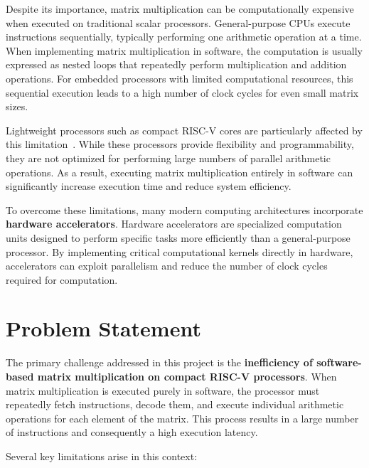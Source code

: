 ﻿\documentclass[12pt,a4paper]{report}
\begin{document}
Despite its importance, matrix multiplication can be computationally expensive when executed on traditional scalar processors. 
General-purpose CPUs execute instructions sequentially, typically performing one arithmetic operation at a time. 
When implementing matrix multiplication in software, the computation is usually expressed as nested loops that repeatedly perform multiplication and addition operations. 
For embedded processors with limited computational resources, this sequential execution leads to a high number of clock cycles for even small matrix sizes.

Lightweight processors such as compact RISC-V cores are particularly affected by this limitation~\cite{asanovic2014instruction}.
While these processors provide flexibility and programmability, they are not optimized for performing large numbers of parallel arithmetic operations. 
As a result, executing matrix multiplication entirely in software can significantly increase execution time and reduce system efficiency.

To overcome these limitations, many modern computing architectures incorporate \textbf{hardware accelerators}. 
Hardware accelerators are specialized computation units designed to perform specific tasks more efficiently than a general-purpose processor. 
By implementing critical computational kernels directly in hardware, accelerators can exploit parallelism and reduce the number of clock cycles required for computation.

\section{Problem Statement}

The primary challenge addressed in this project is the \textbf{inefficiency of software-based matrix multiplication on compact RISC-V processors}. 
When matrix multiplication is executed purely in software, the processor must repeatedly fetch instructions, decode them, and execute individual arithmetic operations for each element of the matrix. 
This process results in a large number of instructions and consequently a high execution latency.

Several key limitations arise in this context:
\end{document}
